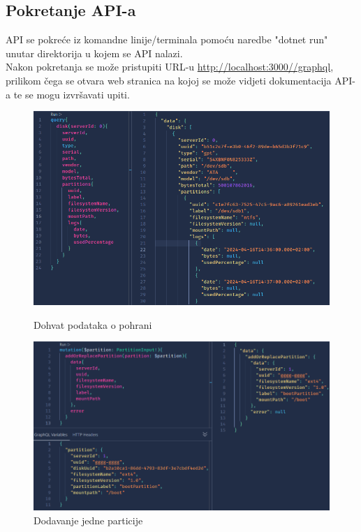 \documentclass[zavrsnirad]{fer}
\begin{document}
\subsection{Pokretanje API-a}
API se pokreće iz komandne linije/terminala pomoću naredbe "dotnet run" unutar direktorija u kojem se API nalazi.
\\Nakon pokretanja se može pristupiti URL-u \url{http://localhost:3000//graphql}, prilikom čega se otvara web stranica na kojoj se može vidjeti dokumentacija API-a te se mogu izvršavati upiti.
\begin{figure}[!htb]
	\centering
	\includegraphics[width=1\linewidth]{images/api_query.png} 
	\caption{Dohvat podataka o pohrani}
	\label{slk:api_query}
	\includegraphics[width=1\linewidth]{images/api_mutation.png} 
	\caption{Dodavanje jedne particije}
	\label{slk:api_mutation}
\end{figure}
\end{document}
